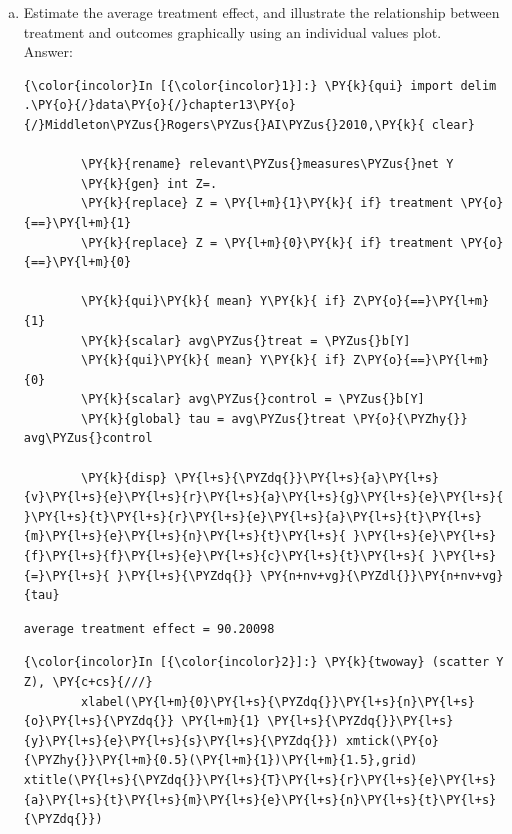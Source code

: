 \documentclass[11pt,notitlepage]{article}\usepackage[]{graphicx}\usepackage[]{color}
\makeatletter
\newenvironment{kframe}{%
 \def\at@end@of@kframe{}%
 \ifinner\ifhmode%
  \def\at@end@of@kframe{\end{minipage}}%
  \begin{minipage}{\columnwidth}%
 \fi\fi%
 \def\FrameCommand##1{\hskip\@totalleftmargin \hskip-\fboxsep
 \colorbox{shadecolor}{##1}\hskip-\fboxsep
     \hskip-\linewidth \hskip-\@totalleftmargin \hskip\columnwidth}%
 \MakeFramed {\advance\hsize-\width
   \@totalleftmargin\z@ \linewidth\hsize
   \@setminipage}}%
 {\par\unskip\endMakeFramed%
 \at@end@of@kframe}
\newenvironment{knitrout}{}{} %
\makeatother
\begin{document}
\begin{enumerate}[a)]
\item Estimate the average treatment effect, and illustrate the relationship between treatment and outcomes graphically using an individual values plot.\\
Answer:\\
\begin{knitrout}
\color{fgcolor}\begin{kframe}
    \begin{Verbatim}[commandchars=\\\{\}]
{\color{incolor}In [{\color{incolor}1}]:} \PY{k}{qui} import delim .\PY{o}{/}data\PY{o}{/}chapter13\PY{o}{/}Middleton\PYZus{}Rogers\PYZus{}AI\PYZus{}2010,\PY{k}{ clear}
        
        \PY{k}{rename} relevant\PYZus{}measures\PYZus{}net Y
        \PY{k}{gen} int Z=.
        \PY{k}{replace} Z = \PY{l+m}{1}\PY{k}{ if} treatment \PY{o}{==}\PY{l+m}{1}
        \PY{k}{replace} Z = \PY{l+m}{0}\PY{k}{ if} treatment \PY{o}{==}\PY{l+m}{0}
        
        \PY{k}{qui}\PY{k}{ mean} Y\PY{k}{ if} Z\PY{o}{==}\PY{l+m}{1}
        \PY{k}{scalar} avg\PYZus{}treat = \PYZus{}b[Y]
        \PY{k}{qui}\PY{k}{ mean} Y\PY{k}{ if} Z\PY{o}{==}\PY{l+m}{0}
        \PY{k}{scalar} avg\PYZus{}control = \PYZus{}b[Y]
        \PY{k}{global} tau = avg\PYZus{}treat \PY{o}{\PYZhy{}} avg\PYZus{}control
        
        \PY{k}{disp} \PY{l+s}{\PYZdq{}}\PY{l+s}{a}\PY{l+s}{v}\PY{l+s}{e}\PY{l+s}{r}\PY{l+s}{a}\PY{l+s}{g}\PY{l+s}{e}\PY{l+s}{ }\PY{l+s}{t}\PY{l+s}{r}\PY{l+s}{e}\PY{l+s}{a}\PY{l+s}{t}\PY{l+s}{m}\PY{l+s}{e}\PY{l+s}{n}\PY{l+s}{t}\PY{l+s}{ }\PY{l+s}{e}\PY{l+s}{f}\PY{l+s}{f}\PY{l+s}{e}\PY{l+s}{c}\PY{l+s}{t}\PY{l+s}{ }\PY{l+s}{=}\PY{l+s}{ }\PY{l+s}{\PYZdq{}} \PY{n+nv+vg}{\PYZdl{}}\PY{n+nv+vg}{tau}
\end{Verbatim}

    \begin{Verbatim}[commandchars=\\\{\}]
average treatment effect = 90.20098

    \end{Verbatim}

    \begin{Verbatim}[commandchars=\\\{\}]
{\color{incolor}In [{\color{incolor}2}]:} \PY{k}{twoway} (scatter Y Z), \PY{c+cs}{///}
        xlabel(\PY{l+m}{0}\PY{l+s}{\PYZdq{}}\PY{l+s}{n}\PY{l+s}{o}\PY{l+s}{\PYZdq{}} \PY{l+m}{1} \PY{l+s}{\PYZdq{}}\PY{l+s}{y}\PY{l+s}{e}\PY{l+s}{s}\PY{l+s}{\PYZdq{}}) xmtick(\PY{o}{\PYZhy{}}\PY{l+m}{0.5}(\PY{l+m}{1})\PY{l+m}{1.5},grid) xtitle(\PY{l+s}{\PYZdq{}}\PY{l+s}{T}\PY{l+s}{r}\PY{l+s}{e}\PY{l+s}{a}\PY{l+s}{t}\PY{l+s}{m}\PY{l+s}{e}\PY{l+s}{n}\PY{l+s}{t}\PY{l+s}{\PYZdq{}})
        

\end{Verbatim}
\end{kframe}
\end{knitrout}
\end{enumerate}
\end{document}
